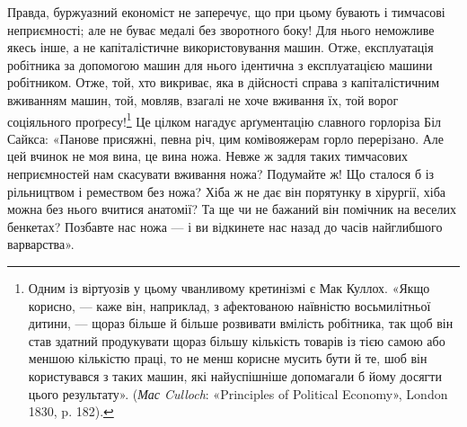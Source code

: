 Правда, буржуазний економіст не заперечує, що при цьому
бувають і тимчасові неприємності; але не буває медалі без зворотного
боку! Для нього неможливе якесь інше, а не капіталістичне
використовування машин. Отже, експлуатація робітника за допомогою
машин для нього ідентична з експлуатацією машини робітником.
Отже, той, хто викриває, яка в дійсності справа з капіталістичним
вживанням машин, той, мовляв, взагалі не хоче вживання
їх, той ворог соціяльного проґресу!\footnote{
Одним із віртуозів у цьому чванливому кретинізмі є Мак Куллох.
«Якщо корисно, — каже він, наприклад, з афектованою наївністю
восьмилітньої дитини, — щораз більше й більше розвивати вмілість робітника,
так щоб він став здатний продукувати щораз більшу кількість товарів
із тією самою або меншою кількістю праці, то не менш корисне мусить
бути й те, шоб він користувався з таких машин, які найуспішніше допомагали
б йому досягти цього результату». (\emph{Мас Culloch}: «Principles
of Political Economy», London 1830, p. 182).
} Це цілком нагадує
арґументацію славного горлоріза Біл Сайкса: «Панове присяжні,
певна річ, цим комівояжерам горло перерізано. Але цей вчинок
не моя вина, це вина ножа. Невже ж задля таких тимчасових
неприємностей нам скасувати вживання ножа? Подумайте ж!
Що сталося б із рільництвом і ремеством без ножа? Хіба ж не
дає він порятунку в хірургії, хіба можна без нього вчитися анатомії?
Та ще чи не бажаний він помічник на веселих бенкетах?
Позбавте нас ножа — і ви відкинете нас назад до часів найглибшого
варварства».

